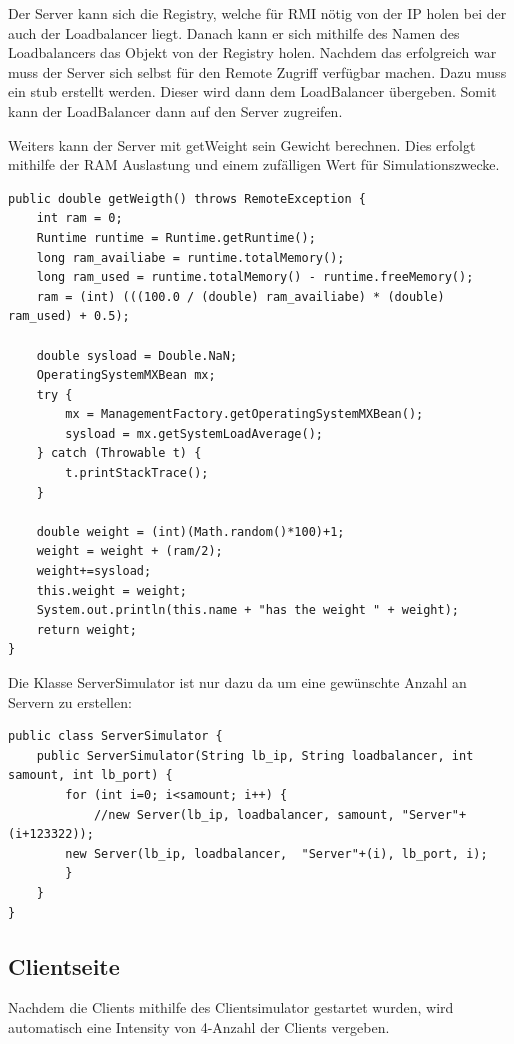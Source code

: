 Der Server kann sich die Registry, welche für RMI nötig von der IP holen bei der auch der Loadbalancer liegt.
Danach kann er sich mithilfe des Namen des Loadbalancers das Objekt von der Registry holen. 
Nachdem das erfolgreich war muss der Server sich selbst für den Remote Zugriff verfügbar machen. 
Dazu muss ein stub erstellt werden. Dieser wird dann dem LoadBalancer übergeben. 
Somit kann der LoadBalancer dann auf den Server zugreifen. 

Weiters kann der Server mit getWeight sein Gewicht berechnen. Dies erfolgt mithilfe der RAM Auslastung und einem zufälligen Wert für Simulationszwecke. 

\clearpage

\begin{lstlisting}[style=Java, caption=Server getWeight]	
  public double getWeigth() throws RemoteException {
	int ram = 0;
	Runtime runtime = Runtime.getRuntime();
	long ram_availiabe = runtime.totalMemory();
	long ram_used = runtime.totalMemory() - runtime.freeMemory();
	ram = (int) (((100.0 / (double) ram_availiabe) * (double) ram_used) + 0.5);
	
	double sysload = Double.NaN;
	OperatingSystemMXBean mx;
	try {
		mx = ManagementFactory.getOperatingSystemMXBean();
		sysload = mx.getSystemLoadAverage();
	} catch (Throwable t) {
		t.printStackTrace();
	}
	
	double weight = (int)(Math.random()*100)+1;
	weight = weight + (ram/2);
	weight+=sysload;
	this.weight = weight;
	System.out.println(this.name + "has the weight " + weight);
	return weight;
}
\end{lstlisting}


Die Klasse ServerSimulator ist nur dazu da um eine gewünschte Anzahl an Servern zu erstellen:


\begin{lstlisting}[style=Java, caption=Server Simulator]	
public class ServerSimulator {
	public ServerSimulator(String lb_ip, String loadbalancer, int samount, int lb_port) {
		for (int i=0; i<samount; i++) {
			//new Server(lb_ip, loadbalancer, samount, "Server"+(i+123322));
		new Server(lb_ip, loadbalancer,  "Server"+(i), lb_port, i);
		}
	}
}

\end{lstlisting}

\clearpage

\subsection{Clientseite}
Nachdem die Clients mithilfe des Clientsimulator gestartet wurden, wird automatisch eine Intensity von 4-Anzahl der Clients vergeben.

